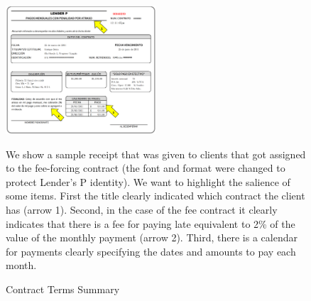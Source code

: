 \begin{figure}[H]
     \caption{Contract Terms Summary}
    \label{PaperSlip}
    \begin{center}
        \includegraphics[width=0.5\textwidth]{Figuras/TicketLenderP.png}
    
    \end{center}
    \scriptsize{
        We show a sample receipt that was given to clients that got assigned to the fee-forcing contract (the font and format were changed to protect Lender's P identity). We want to highlight the salience of some items. First the title clearly indicated which contract the client has (arrow 1). Second, in the case of the fee contract it clearly indicates that there is a fee for paying late equivalent to 2\% of the value of the monthly payment (arrow 2). Third, there is a calendar for payments clearly specifying the dates and amounts to pay each month. %
        }
\end{figure}



